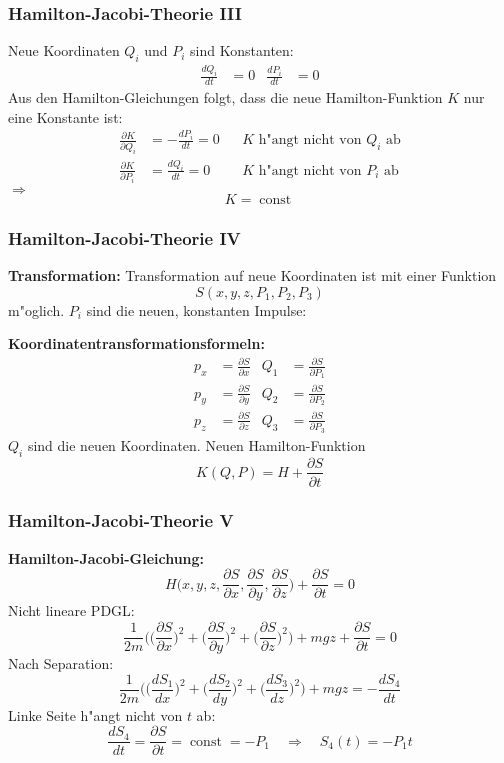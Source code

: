 \documentclass{beamer}
\begin{document}
\begin{frame}
\frametitle{Hamilton-Jacobi-Theorie III}
Neue Koordinaten $Q_i$ und $P_i$ sind Konstanten: 
\begin{align*}
\frac{dQ_i}{dt}&=0&
\frac{dP_i}{dt}&=0
\end{align*}
Aus den Hamilton-Gleichungen folgt, dass die neue Hamilton-Funktion $K$ nur
eine Konstante ist:
\begin{align*}
\frac{\partial K}{\partial Q_i}&=-\frac{dP_i}{dt}=0&&\text{$K$ h"angt nicht von $Q_i$ ab}\\
\frac{\partial K}{\partial P_i}&=\frac{dQ_i}{dt}=0&&\text{$K$ h"angt nicht von $P_i$ ab}
\end{align*}
$\Rightarrow$
\[
K=\operatorname{const}
\]
\end{frame}

\begin{frame}
\frametitle{Hamilton-Jacobi-Theorie IV}

{\bf Transformation:} Transformation auf neue Koordinaten ist mit einer Funktion
\[
S(x,y,z,P_1,P_2,P_3)
\]
m"oglich.  $P_i$ sind die neuen, konstanten Impulse:

{\bf Koordinatentransformationsformeln:}
\begin{align*}
p_x&=\frac{\partial S}{\partial x}&
Q_1&=\frac{\partial S}{\partial P_1}\\
p_y&=\frac{\partial S}{\partial y}&
Q_2&=\frac{\partial S}{\partial P_2}\\
p_z&=\frac{\partial S}{\partial z}&
Q_3&=\frac{\partial S}{\partial P_3}
\end{align*}
$Q_i$ sind die neuen Koordinaten.
Neuen Hamilton-Funktion
\[
K(Q,P)=H+\frac{\partial S}{\partial t}
\]
\end{frame}

\begin{frame}
\frametitle{Hamilton-Jacobi-Theorie V}

{\bf Hamilton-Jacobi-Gleichung:}
\[
H\biggl(x,y,z,\frac{\partial S}{\partial x},\frac{\partial S}{\partial y},\frac{\partial S}{\partial z}\biggr)+\frac{\partial S}{\partial t}=0
\]
Nicht lineare PDGL:
\[
\frac1{2m}\biggl(
\biggl(\frac{\partial S}{\partial x}\biggr)^2
+
\biggl(\frac{\partial S}{\partial y}\biggr)^2
+
\biggl(\frac{\partial S}{\partial z}\biggr)^2
\biggr)
+mgz+\frac{\partial S}{\partial t}
=0
\]
Nach Separation:
\[
\frac1{2m}\biggl(
\biggl(\frac{dS_1}{dx}\biggr)^2
+
\biggl(\frac{dS_2}{dy}\biggr)^2
+
\biggl(\frac{dS_3}{dz}\biggr)^2
\biggr)+mgz=-\frac{dS_4}{dt}
\]
Linke Seite h"angt nicht von $t$ ab:
\[
\frac{dS_4}{dt}=\frac{\partial S}{\partial t}=\operatorname{const}=-P_1
\quad\Rightarrow\quad
S_4(t)=-P_1t
\]
\end{frame}
\end{document}
